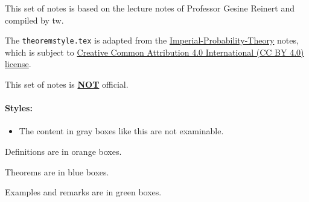 \thispagestyle{empty}
This set of notes is based on the lecture notes of Professor Gesine Reinert and compiled by tw.  

The \verb|theoremstyle.tex| is adapted from the \href{https://github.com/Samuel-CHLam/Imperial-Probability-Theory}{Imperial-Probability-Theory} notes, which is subject to \href{https://github.com/Samuel-CHLam/Imperial-Probability-Theory#license}{Creative Common Attribution 4.0 International (CC BY 4.0) license}.  


This set of notes is \underline{\bf NOT} official.

\paragraph{Styles:}
\begin{unexaminable}
\begin{itemize}
    \item The content in gray boxes like this are not examinable.
\end{itemize}
\end{unexaminable}  
 
\begin{definition}
    Definitions are in orange boxes.
\end{definition}
\begin{theorem}
    Theorems are in blue boxes.
\end{theorem}

\begin{example}
    Examples and remarks are in green boxes. 
\end{example}



